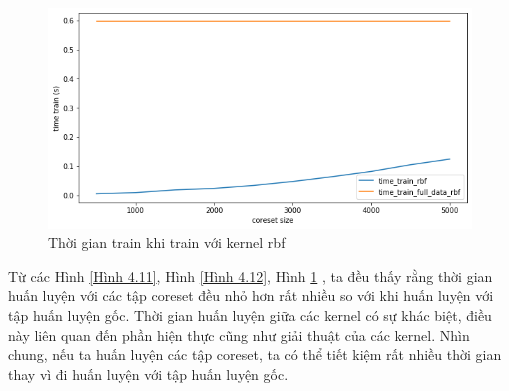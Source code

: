 \documentclass[a4paper, 12pt, oneside]{report}
\begin{document}
\begin{center}
    \begin{figure}[H]
    \begin{center}
     \includegraphics[scale=0.4]{HTRU2_3.png}
    \end{center}
    \caption{Thời gian train khi train với kernel rbf}
    \label{Hình 4.13}
    \end{figure}
\end{center}

Từ các Hình \ref{Hình 4.11}, Hình \ref{Hình 4.12}, Hình \ref{Hình 4.13} , ta đều thấy rằng thời gian huấn luyện với các tập coreset đều nhỏ hơn rất nhiều so với khi huấn luyện với tập huấn luyện gốc. Thời gian huấn luyện giữa các kernel có sự khác biệt, điều này liên quan đến phần hiện thực cũng như giải thuật của các kernel. Nhìn chung, nếu ta huấn luyện các tập coreset, ta có thể tiết kiệm rất nhiều thời gian thay vì đi huấn luyện với tập huấn luyện gốc. 
\end{document}
